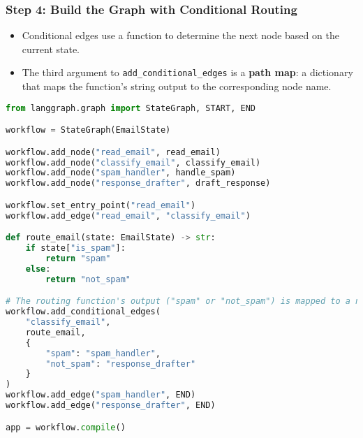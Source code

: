 \begin{frame}[fragile]\frametitle{Step 4: Build the Graph with Conditional Routing}
      \begin{itemize}
        \item Conditional edges use a function to determine the next node based on the current state.
        \item The third argument to \texttt{add\_conditional\_edges} is a \textbf{path map}: a dictionary that maps the function's string output to the corresponding node name.
      \end{itemize}
\begin{lstlisting}[language=Python, basicstyle=\tiny]
from langgraph.graph import StateGraph, START, END

workflow = StateGraph(EmailState)

workflow.add_node("read_email", read_email)
workflow.add_node("classify_email", classify_email)
workflow.add_node("spam_handler", handle_spam)
workflow.add_node("response_drafter", draft_response)

workflow.set_entry_point("read_email")
workflow.add_edge("read_email", "classify_email")

def route_email(state: EmailState) -> str:
    if state["is_spam"]:
        return "spam"
    else:
        return "not_spam"

# The routing function's output ("spam" or "not_spam") is mapped to a node name
workflow.add_conditional_edges(
    "classify_email",
    route_email,
    {
        "spam": "spam_handler",
        "not_spam": "response_drafter"
    }
)
workflow.add_edge("spam_handler", END)
workflow.add_edge("response_drafter", END)

app = workflow.compile()
\end{lstlisting}
\end{frame}

